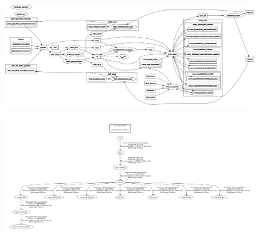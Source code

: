 \documentclass[12]{article}
\begin{document}
\begin{landscape}
\newpage
\begin{figure}
    \centering
    \includegraphics[width=\columnwidth]{images/rosgraph.png}
\end{figure}
\end{landscape}
\begin{landscape}
\newpage
\begin{figure}
    \centering
    \includegraphics[width=\columnwidth]{images/frames-1.png}
\end{figure}

\end{landscape}
\end{document}
